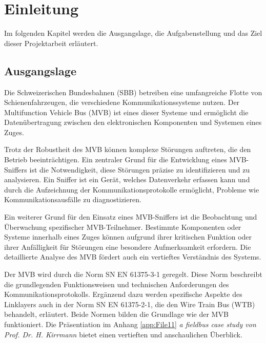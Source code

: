 

\chapter{Einleitung} %
\label{Einleitung}
Im folgenden Kapitel werden die Ausgangslage, die Aufgabenstellung und das Ziel dieser Projektarbeit erläutert.

\section{Ausgangslage} %
\label{Ausgangslage} %


Die Schweizerischen Bundesbahnen (SBB) betreiben eine umfangreiche Flotte von Schienenfahrzeugen, die verschiedene Kommunikationssysteme nutzen. Der Multifunction Vehicle Bus (MVB) ist eines dieser Systeme und ermöglicht die Datenübertragung zwischen den elektronischen Komponenten und Systemen eines Zuges.

Trotz der Robustheit des MVB können komplexe Störungen auftreten, die den Betrieb beeinträchtigen. Ein zentraler Grund für die Entwicklung eines MVB-Sniffers ist die Notwendigkeit, diese Störungen präzise zu identifizieren und zu analysieren. Ein Sniffer ist ein Gerät, welches Datenverkehr erfassen kann und durch die Aufzeichnung der Kommunikationsprotokolle ermöglicht, Probleme wie Kommunikationsausfälle zu diagnostizieren.

Ein weiterer Grund für den Einsatz eines MVB-Sniffers ist die Beobachtung und Überwachung spezifischer MVB-Teilnehmer. Bestimmte Komponenten oder Systeme innerhalb eines Zuges können aufgrund ihrer kritischen Funktion oder ihrer Anfälligkeit für Störungen eine besondere Aufmerksamkeit erfordern. Die detaillierte Analyse des MVB fördert auch ein vertieftes Verständnis des Systems.

Der MVB wird durch die Norm SN EN 61375-3-1 geregelt. Diese Norm beschreibt die grundlegenden Funktionsweisen und technischen Anforderungen des Kommunikationsprotokolls. Ergänzend dazu werden spezifische Aspekte des Linklayers auch in der Norm SN EN 61375-2-1, die den Wire Train Bus (WTB) behandelt, erläutert. Beide Normen bilden die Grundlage wie der MVB funktioniert. Die Präsentiation im Anhang \ref{app:File11} \textit{a fieldbus case study von Prof. Dr. H. Kirrmann} bietet einen vertieften und anschaulichen Überblick.
\newpage

